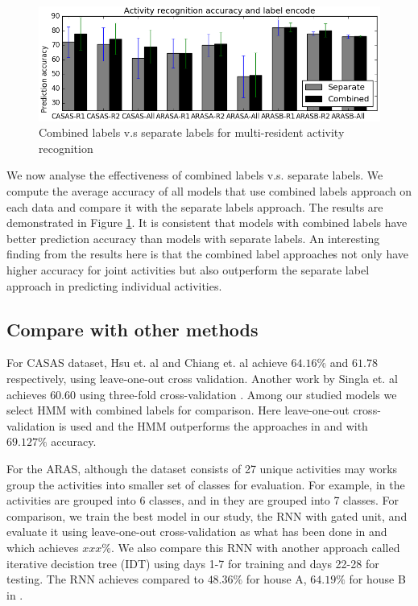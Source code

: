 \begin{figure}[ht]
  \centering
  \includegraphics[width=1\textwidth]{labels_analyse.png}
    \caption{Combined labels v.s separate labels for multi-resident activity recognition}
    \label{fig:combined_vs_separate}
\end{figure}
We now analyse the effectiveness of combined labels v.s. separate labels. We compute the average accuracy of all models that use combined labels approach on each data and compare it with the separate labels approach. The results are demonstrated in Figure \ref{fig:combined_vs_separate}. It is consistent that models with combined labels have better prediction accuracy than models with separate labels. An interesting finding from the results here is that the combined label approaches not only have higher  accuracy for joint activities but also outperform the separate label approach in predicting individual activities.


\subsection{Compare with other methods}
\label{subsec:compare}
For CASAS dataset, Hsu et. al  \cite{Hsu_2010} and Chiang et. al \cite{Chiang_2010} achieve $64.16\%$ and  $61.78$ respectively, using leave-one-out cross validation. Another work by Singla et. al achieves $60.60$ using three-fold cross-validation \cite{Singla_2010}. Among our studied models we select HMM with combined labels for comparison. Here leave-one-out cross-validation is used and the HMM outperforms the approaches in \cite{Hsu_2010} and \cite{Chiang_2010} with  $69.127\%$ accuracy.

For the ARAS, although the dataset consists of 27 unique activities may works group the activities into smaller set of classes for evaluation. For example, in \cite{Alemdar_2013} the activities are grouped into 6 classes, and in \cite{Tuncan_2014} they are grouped into 7 classes. For comparison, we train the best model in our study, the RNN with gated unit, and evaluate it using leave-one-out cross-validation as what has been done in \cite{Alemdar_2013} and \cite{Tucan_2014} which achieves $xxx\%$. We also compare this RNN with another approach called  iterative decistion tree (IDT) \cite{Prossegger_2014} using days 1-7 for training and days 22-28 for testing. The RNN achieves  compared to $48.36\%$ for house A, $64.19\%$ for house B  in \cite{Prossegger_2014}.
